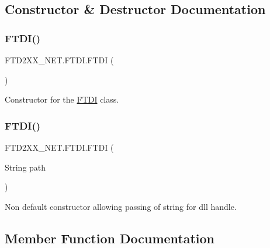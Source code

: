 \subsection{Constructor \& Destructor Documentation}
\mbox{\label{class_f_t_d2_x_x___n_e_t_1_1_f_t_d_i_a227eed3678fb2faa42d9825a611c664a}} 
\subsubsection{\texorpdfstring{FTDI()}{FTDI()}\hspace{0.1cm}{\footnotesize\ttfamily [1/2]}}
{\footnotesize\ttfamily F\+T\+D2\+X\+X\+\_\+\+N\+E\+T.\+F\+T\+D\+I.\+F\+T\+DI (\begin{DoxyParamCaption}{ }\end{DoxyParamCaption})}



Constructor for the \mbox{\hyperlink{class_f_t_d2_x_x___n_e_t_1_1_f_t_d_i}{F\+T\+DI}} class. 

\mbox{\label{class_f_t_d2_x_x___n_e_t_1_1_f_t_d_i_aacdcc95380200eaf2475fcf8661797dc}} 
\subsubsection{\texorpdfstring{FTDI()}{FTDI()}\hspace{0.1cm}{\footnotesize\ttfamily [2/2]}}
{\footnotesize\ttfamily F\+T\+D2\+X\+X\+\_\+\+N\+E\+T.\+F\+T\+D\+I.\+F\+T\+DI (\begin{DoxyParamCaption}\item[{String}]{path }\end{DoxyParamCaption})}



Non default constructor allowing passing of string for dll handle. 



\subsection{Member Function Documentation}
\mbox{\label{class_f_t_d2_x_x___n_e_t_1_1_f_t_d_i_afdbec3db2b73f8873bcfee5ce2984be7}} 
